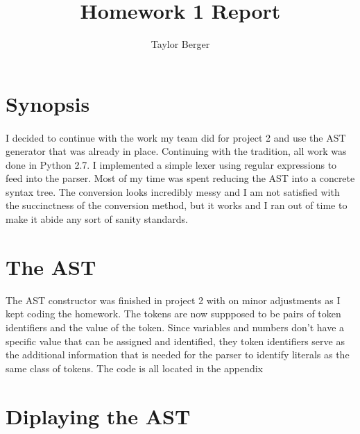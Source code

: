 \documentclass{article}
\title{Homework 1 Report}
\author{Taylor Berger}
\begin{document}
\maketitle
\section{Synopsis}
\paragraph{} I decided to continue with the work my team did for project 2 and use the AST generator that was already in place. Continuing with the tradition, all work was done in Python 2.7. I implemented a simple lexer using regular expressions to feed into the parser. Most of my time was spent reducing the AST into a concrete syntax tree. The conversion looks incredibly messy and I am not satisfied with the succinctness of the conversion method, but it works and I ran out of time to make it abide any sort of sanity standards.

\section{The AST}
The AST constructor was finished in project 2 with on minor adjustments as I kept coding the homework. The tokens are now suppposed to be pairs of token identifiers and the value of the token. Since variables and numbers don't have a specific value that can be assigned and identified, they token identifiers serve as the additional information that is needed for the parser to identify literals as the same class of tokens. The code is all located in the appendix

\section{Diplaying the AST}
\end{document}
